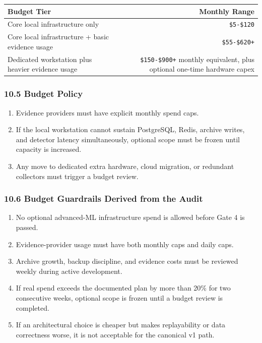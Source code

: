 \documentclass[
]{article}
\newcounter{none} %
\providecommand{\tightlist}{%
  \setlength{\itemsep}{0pt}\setlength{\parskip}{0pt}}
\begin{document}
{\def\LTcaptype{none} %
\begin{longtable}[]{@{}lr@{}}
\toprule\noalign{}
Budget Tier & Monthly Range \\
\midrule\noalign{}
\endhead
\bottomrule\noalign{}
\endlastfoot
Core local infrastructure only & \texttt{\$5-\$120} \\
Core local infrastructure + basic evidence usage &
\texttt{\$55-\$620+} \\
Dedicated workstation plus heavier evidence usage &
\texttt{\$150-\$900+} monthly equivalent, plus optional one-time hardware
capex \\
\end{longtable}
}

\subsubsection{10.5 Budget Policy}\label{105-budget-policy}

\begin{enumerate}
\def\labelenumi{\arabic{enumi}.}
\tightlist
\item
  Evidence providers must have explicit monthly spend caps.
\item
  If the local workstation cannot sustain PostgreSQL, Redis, archive
  writes, and detector latency simultaneously, optional scope must be
  frozen until capacity is increased.
\item
  Any move to dedicated extra hardware, cloud migration, or redundant
  collectors must trigger a budget review.
\end{enumerate}

\subsubsection{10.6 Budget Guardrails Derived from the
Audit}\label{106-budget-guardrails-derived-from-the-audit}

\begin{enumerate}
\def\labelenumi{\arabic{enumi}.}
\tightlist
\item
  No optional advanced-ML infrastructure spend is allowed before Gate 4
  is passed.
\item
  Evidence-provider usage must have both monthly caps and daily caps.
\item
  Archive growth, backup discipline, and evidence costs must be reviewed
  weekly during active development.
\item
  If real spend exceeds the documented plan by more than 20\% for two
  consecutive weeks, optional scope is frozen until a budget review is
  completed.
\item
  If an architectural choice is cheaper but makes replayability or data
  correctness worse, it is not acceptable for the canonical v1 path.
\end{enumerate}
\end{document}
